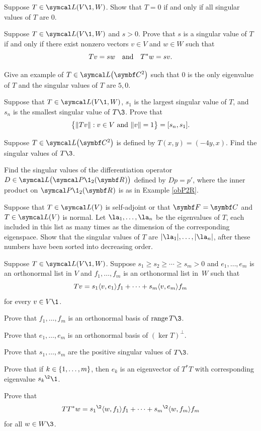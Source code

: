 \begin{exercises}

\exercise
Suppose $T \in \L(V\1, W)$. Show that $T = 0$ if and only if all singular values of $T$ are $0$.


\exercise
Suppose $T \in \L(V\1, W)$ and $s > 0$. Prove that $s$ is a singular value of $T$ if and only if there exist nonzero vectors $v \in V$ and
$w \in W$ such that \label{2Schmidt}
\[
Tv = sw \andd T^* w = sv.
\]
\exercisedisplayend
{}


\exercise
Give an example of $T \in \L\paren[\big]{\C2}$ such that $0$ is the only eigenvalue of $T$ and the singular values of $T$ are $5, 0$.


\exercise
Suppose that $T \in \L(V\1, W)$, $s_1$ is the largest singular value of $T$, and $s_n$ is the smallest singular value of $T\3$. Prove that\label{3interval}
\[
\br[\big]{ \norm{Tv} : v \in V \text{ and } \norm{v} = 1 } = [s_n, s_1].
\]
\exercisedisplayend


\exercise
Suppose $T \in \L\paren[\big]{\C{2}}$ is defined by $T(x, y) = (-4y, x)$. Find the singular values of $T\3$.


\exercise
Find the singular values of the differentiation operator $D \in \L\bigl(\P\1_2(\R{})\bigr)$ defined by $Dp = p'\!$, where the inner product on $\P\1_2(\R{})$ is as in Example \ref{obP2R}.


\exercise
Suppose that $T \in \L(V)$ is self-adjoint or that $\F{}= \C{}$ and $T \in \L(V)$ is normal. Let $\la_1, \ldots, \la_n$ be the eigenvalues of $T$, each included in this list as many times as the dimension of the corresponding eigenspace. Show that the singular values of $T$ are
$\abs{\la_1}, \ldots, \abs{\la_n}$, after these numbers have been sorted into decreasing order.\label{7singsp}


\exercise
Suppose $T \in \L(V\1, W)$. Suppose $s_1 \ge  s_2 \ge \cdots \ge s_m >0$ and
$e_1, \dots, e_m$ is an orthonormal list in $V$ and $f_1, \dots, f_m$ is an orthonormal list in~$W$ such that \label{4SVD}
\[
Tv = s_1 \ip{v, e_1} f_1 + \dots + s_m \ip{v, e_m} f_m
\]
for every $v \in V\1$.
\begin{subtheorem}
\item
Prove that $f_1, \dots, f_m$ is an orthonormal basis of $\ran T\3$.
\item
Prove that $e_1, \dots, e_m$  is an orthonormal basis of $(\ker T)^\perp$.
\item
Prove that $s_1, \ldots, s_m$ are the positive singular values of $T\3$.
\item
Prove that if $k \in \br{1, \ldots, m}$, then $e_k$ is an eigenvector of $T^*T$ with corresponding eigenvalue ${s_k}^{\2}\1$.
\item
Prove that
\[
TT^*w = {s_1}^{\2} \ip{w, f_1} f_1 + \cdots + {s_m}^{\2} \ip{w, f_m} f_m
\]
for all $w \in W\3$.
\end{subtheorem}
\exercisesubtheoremend



\end{exercises}
